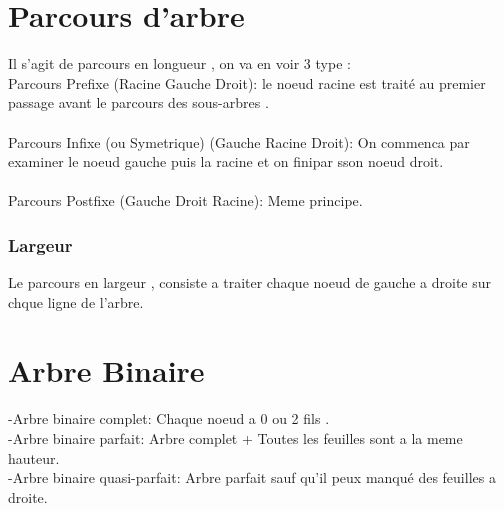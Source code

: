 \documentclass[a4paper,12pt,openany]{book}
\begin{document}

\chapter{Parcours d'arbre}


Il s'agit de parcours en longueur , on va en voir 3 type :\\

Parcours Prefixe (Racine Gauche Droit): le noeud racine est traité au premier passage avant le parcours des sous-arbres .\\
\\
Parcours Infixe (ou Symetrique) (Gauche Racine Droit): On commenca par examiner le noeud gauche puis la racine et on finipar sson noeud droit.\\
\\
Parcours Postfixe (Gauche Droit Racine): Meme principe.\\

\subsection{Largeur}

Le parcours en largeur , consiste a traiter chaque noeud de gauche a droite sur chque ligne de l'arbre.\\




\chapter{Arbre Binaire}

-Arbre binaire complet: Chaque noeud a 0 ou 2 fils .\\
-Arbre binaire parfait: Arbre complet + Toutes les feuilles sont a la meme hauteur.\\
-Arbre binaire quasi-parfait: Arbre parfait sauf qu'il peux manqué des feuilles a droite.\\
\end{document}
